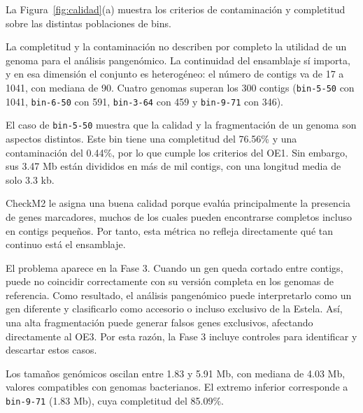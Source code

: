 La Figura~\ref{fig:calidad}(a) muestra los criterios de contaminación y completitud sobre las distintas poblaciones de bins.

La completitud y la contaminación no describen por completo la utilidad de un
genoma para el análisis pangenómico. La continuidad del ensamblaje sí importa, y
en esa dimensión el conjunto es heterogéneo: el número de contigs va de 17 a
1041, con mediana de 90. Cuatro genomas superan los 300 contigs
(\texttt{bin-5-50} con 1041, \texttt{bin-6-50} con 591, \texttt{bin-3-64} con
459 y \texttt{bin-9-71} con 346).

El caso de \texttt{bin-5-50} muestra que la calidad y la fragmentación de un genoma son aspectos distintos. Este bin tiene una completitud del 76.56\% y una contaminación del 0.44\%, por lo que cumple los criterios del OE1. Sin embargo, sus 3.47 Mb están divididos en más de mil contigs, con una longitud media de solo 3.3 kb.

CheckM2 le asigna una buena calidad porque evalúa principalmente la presencia de genes marcadores, muchos de los cuales pueden encontrarse completos incluso en contigs pequeños. Por tanto, esta métrica no refleja directamente qué tan continuo está el ensamblaje.

El problema aparece en la Fase 3. Cuando un gen queda cortado entre contigs, puede no coincidir correctamente con su versión completa en los genomas de referencia. Como resultado, el análisis pangenómico puede interpretarlo como un gen diferente y clasificarlo como accesorio o incluso exclusivo de la Estela. Así, una alta fragmentación puede generar falsos genes exclusivos, afectando directamente al OE3. Por esta razón, la Fase 3 incluye controles para identificar y descartar estos casos.


Los tamaños genómicos oscilan entre 1.83 y 5.91 Mb, con mediana de 4.03 Mb,
valores compatibles con genomas bacterianos. El extremo inferior
corresponde a \texttt{bin-9-71} (1.83 Mb), cuya completitud del 85.09\%.

